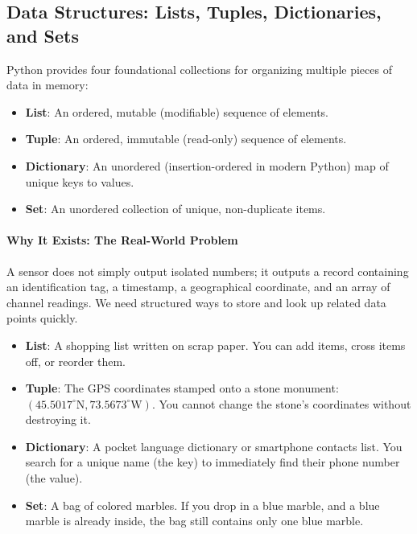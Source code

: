 \subsection{Data Structures: Lists, Tuples, Dictionaries, and Sets}

\begin{keyidea}
Python provides four foundational collections for organizing multiple pieces of data in memory:
\begin{itemize}
    \item \textbf{List}: An ordered, mutable (modifiable) sequence of elements.
    \item \textbf{Tuple}: An ordered, immutable (read-only) sequence of elements.
    \item \textbf{Dictionary}: An unordered (insertion-ordered in modern Python) map of unique keys to values.
    \item \textbf{Set}: An unordered collection of unique, non-duplicate items.
\end{itemize}
\end{keyidea}

\paragraph{Why It Exists: The Real-World Problem}
A sensor does not simply output isolated numbers; it outputs a record containing an identification tag, a timestamp, a geographical coordinate, and an array of channel readings. We need structured ways to store and look up related data points quickly.

\begin{analogy}
\begin{itemize}
    \item \textbf{List}: A shopping list written on scrap paper. You can add items, cross items off, or reorder them.
    \item \textbf{Tuple}: The GPS coordinates stamped onto a stone monument: $(45.5017^\circ\text{N}, 73.5673^\circ\text{W})$. You cannot change the stone's coordinates without destroying it.
    \item \textbf{Dictionary}: A pocket language dictionary or smartphone contacts list. You search for a unique name (the key) to immediately find their phone number (the value).
    \item \textbf{Set}: A bag of colored marbles. If you drop in a blue marble, and a blue marble is already inside, the bag still contains only one blue marble.
\end{itemize}
\end{analogy}

